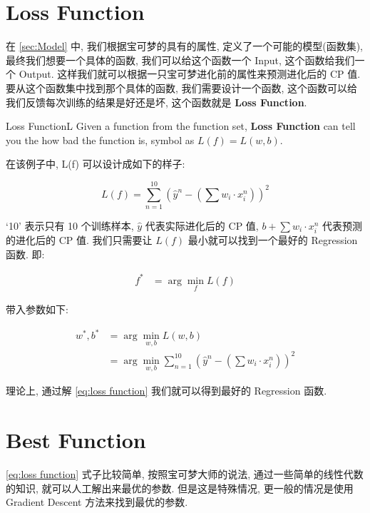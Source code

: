 \section{Loss Function}

在 \ref{sec:Model} 中, 我们根据宝可梦的具有的属性, 定义了一个可能的模型(函数集), 最终我们想要一个具体的函数, 我们可以给这个函数一个 Input, 这个函数给我们一个 Output. 这样我们就可以根据一只宝可梦进化前的属性来预测进化后的 CP 值. 要从这个函数集中找到那个具体的函数, 我们需要设计一个函数, 这个函数可以给我们反馈每次训练的结果是好还是坏, 这个函数就是 \textbf{Loss Function}. 

\begin{definition}{Loss Function}{L}
    Given a function from the function set, \textbf{Loss Function} can tell you the how bad the function is, symbol as $L(f)=L(w, b)$. 
\end{definition}

在该例子中, L(f) 可以设计成如下的样子: 

\begin{equation}
    L(f) = \sum_{n=1}^{10}\left(\hat{y}^{n}-\left(\sum w_i \cdot x_i^n\right)\right)^{2}
\end{equation}

`10' 表示只有 10 个训练样本, $\hat{y}$ 代表实际进化后的 CP 值, $b + \sum w_i \cdot x_i^n$ 代表预测的进化后的 CP 值. 我们只需要让 $L(f)$ 最小就可以找到一个最好的 Regression 函数. 即: 

\begin{align}
    f^{*} &=\arg \min _{f} L(f)
\end{align}

带入参数如下: 

\begin{align}
    w^{*}, b^{*} &=\arg \min _{w, b} L(w, b) \\
    &=\arg \min _{w, b} \sum_{n=1}^{10}\left(\hat{y}^{n}-\left(\sum w_i \cdot x_i^n\right)\right)^{2} \label{eq:loss function}
\end{align}

理论上, 通过解 \ref{eq:loss function} 我们就可以得到最好的 Regression 函数. 


\section{Best Function}

\ref{eq:loss function} 式子比较简单, 按照宝可梦大师的说法, 通过一些简单的线性代数的知识, 就可以人工解出来最优的参数. 但是这是特殊情况, 更一般的情况是使用 Gradient Descent 方法来找到最优的参数. 
